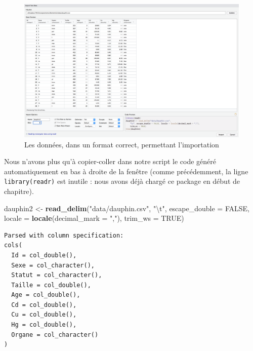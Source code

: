 \documentclass[a4paperpaper,]{article}
\newenvironment{Shaded}{\begin{snugshade}}{\end{snugshade}}
\newcommand{\KeywordTok}[1]{\textcolor[rgb]{0.13,0.29,0.53}{\textbf{#1}}}
\newcommand{\DataTypeTok}[1]{\textcolor[rgb]{0.13,0.29,0.53}{#1}}
\newcommand{\CharTok}[1]{\textcolor[rgb]{0.31,0.60,0.02}{#1}}
\newcommand{\StringTok}[1]{\textcolor[rgb]{0.31,0.60,0.02}{#1}}
\newcommand{\OtherTok}[1]{\textcolor[rgb]{0.56,0.35,0.01}{#1}}
\newcommand{\NormalTok}[1]{#1}
\theoremstyle{definition}
\theoremstyle{definition}
\theoremstyle{definition}
\theoremstyle{remark}
\begin{document}
\begin{figure}[htpb]

{\centering \includegraphics[width=1\linewidth]{images/importcsv4} 

}

\caption{Les données, dans un format correct, permettant l'importation}\label{fig:importcsv4}
\end{figure}

Nous n'avons plus qu'à copier-coller dans notre script le code généré
automatiquement en bas à droite de la fenêtre (comme précédemment, la
ligne \texttt{library(readr)} est inutile : nous avons déjà chargé ce
package en début de chapitre).

\begin{Shaded}
\begin{Highlighting}[]
\NormalTok{dauphin2 <-}\StringTok{ }\KeywordTok{read_delim}\NormalTok{(}\StringTok{"data/dauphin.csv"}\NormalTok{, }
    \StringTok{"}\CharTok{\textbackslash{}t}\StringTok{"}\NormalTok{, }\DataTypeTok{escape_double =} \OtherTok{FALSE}\NormalTok{, }\DataTypeTok{locale =} \KeywordTok{locale}\NormalTok{(}\DataTypeTok{decimal_mark =} \StringTok{","}\NormalTok{), }
    \DataTypeTok{trim_ws =} \OtherTok{TRUE}\NormalTok{)}
\end{Highlighting}
\end{Shaded}

\begin{verbatim}
Parsed with column specification:
cols(
  Id = col_double(),
  Sexe = col_character(),
  Statut = col_character(),
  Taille = col_double(),
  Age = col_double(),
  Cd = col_double(),
  Cu = col_double(),
  Hg = col_double(),
  Organe = col_character()
)
\end{verbatim}
\end{document}
